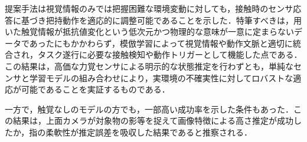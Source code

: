 提案手法は視覚情報のみでは把握困難な環境変動に対しても，接触時のセンサ応答に基づき把持動作を適応的に調整可能であることを示した．特筆すべきは，用いた触覚情報が抵抗値変化という低次元かつ物理的な意味が一意に定まらないデータであったにもかかわらず，模倣学習によって視覚情報や動作文脈と適切に統合され，タスク遂行に必要な接触検知や動作トリガーとして機能した点である．この結果は，高価な力覚センサによる明示的な状態推定を行わずとも，単純なセンサと学習モデルの組み合わせにより，実環境の不確実性に対してロバストな適応が可能であることを実証するものである．\par
一方で，触覚なしのモデルの方でも，一部高い成功率を示した条件もあった．この結果は，上面カメラが対象物の影等を捉えて画像特徴による高さ推定が成功したか，指の柔軟性が推定誤差を吸収した結果であると推察される．
